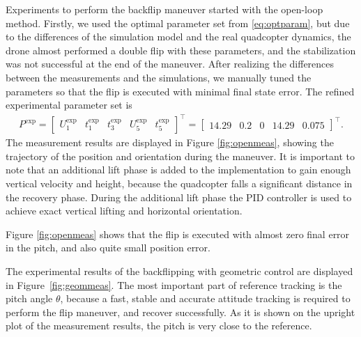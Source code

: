 Experiments to perform the backflip maneuver started with the open-loop method. Firstly, we used the optimal parameter set from \eqref{eq:optparam}, but due to the differences of the simulation model and the real quadcopter dynamics, the drone almost performed a double flip with these parameters, and the stabilization was not successful at the end of the maneuver. After realizing the differences between the measurements and the simulations, we manually tuned the parameters so that the flip is executed with minimal final state error. The refined experimental parameter set is
\begin{align*}
    P^\mathrm{exp} = \begin{bmatrix}
U_1^\mathrm{exp} & t_1^\mathrm{exp} & t_3^\mathrm{exp} & U_5^\mathrm{exp}& t_5^\mathrm{exp}
\end{bmatrix} ^\top =  \begin{bmatrix}
14.29 & 0.2 & 0 & 14.29 & 0.075
\end{bmatrix}^\top.
\end{align*}
The measurement results are displayed in Figure \ref{fig:openmeas}, showing the trajectory of the position and orientation during the maneuver. It is important to note that an additional lift phase is added to the implementation to gain enough vertical velocity and height, because the quadcopter falls a significant distance in the recovery phase. During the additional lift phase the PID controller is used to achieve exact vertical lifting and horizontal orientation.

Figure \ref{fig:openmeas} shows that the flip is executed with almost zero final error in the pitch, and also quite small position error. 

The experimental results of the backflipping with geometric control are displayed in Figure~\ref{fig:geommeas}. The most important part of reference tracking is the pitch angle $\theta$, because a fast, stable and accurate attitude tracking is required to perform the flip maneuver, and recover successfully. As it is shown on the upright plot of the measurement results, the pitch is very close to the reference. 

